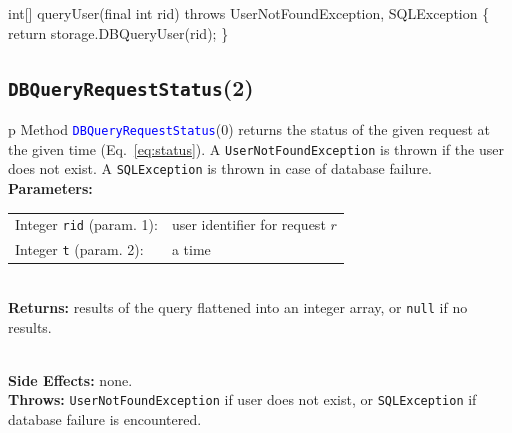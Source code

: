 \nwenddocs{}\endmoddef{}
int[] queryUser(final int rid) throws UserNotFoundException, SQLException \{
  return storage.DBQueryUser(rid);
\}
\eatline
{}\nwendcode{}\nwdocspar
\subsection{{\tt{}\protect{}DBQueryRequestStatus}(2)}
\begin{tabular}{p{\textwidth}}
\toprule
{}
Method \textcolor{blue}{{\tt{}\protect{}DBQueryRequestStatus}}(0) returns the status of
the given request at the given time (Eq.~\ref{eq:status}).
A {\tt{}UserNotFoundException} is thrown if the user does not exist.
A {\tt{}SQLException} is thrown in case of database failure.\\
\midrule
\textbf{Parameters:} \\
\begin{tabular}{lp{116mm}}
Integer {\tt{}rid} (param. 1):&user identifier for request $r$\\
Integer {\tt{}t} (param. 2):&a time
\end{tabular}\\
\textbf{Returns:} results of the query flattened into an integer array, or
{\tt{}null} if no results.

\\
\textbf{Side Effects:} none.\\
\textbf{Throws:} {\tt{}UserNotFoundException} if user does not exist, or
{\tt{}SQLException} if database failure is encountered.\\
\bottomrule
\end{tabular}
